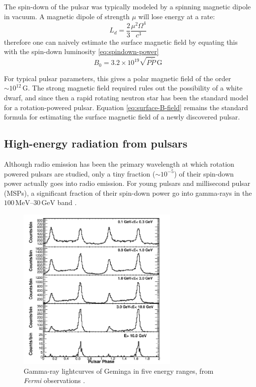 The spin-down of the pulsar was typically modeled by a spinning magnetic dipole
in vacuum. A magnetic dipole of strength $\mu$ will lose energy at a rate:
\begin{equation}
  \label{eq:dipole-spin-down}
  L_{d} = \frac{2}{3}\frac{\mu^2\Omega^4}{c^3}
\end{equation}
therefore one can naively estimate the surface magnetic field by equating this
with the spin-down luminosity \eqref{eq:spindown-power}
\begin{equation}
  \label{eq:surface-B-field}
  B_0 = 3.2\times 10^{19}\sqrt{P \dot{P}}\,\mathrm{G}
\end{equation}

For typical pulsar parameters, this gives a polar magnetic field of the order
$\sim 10^{12}\,\mathrm{G}$. The strong magnetic field required rules out the
possibility of a white dwarf, and since then a rapid rotating neutron star has
been the standard model for a rotation-powered pulsar. Equation
\eqref{eq:surface-B-field} remains the standard formula for estimating the surface
magnetic field of a newly discovered pulsar.

\subsection{High-energy radiation from pulsars}
\label{sec:observ-high-energy}

Although radio emission has been the primary wavelength at which rotation
powered pulsars are studied, only a tiny fraction ($\sim 10^{-5}$) of their
spin-down power actually goes into radio emission. For young pulsars and
millisecond pulsar (MSPs), a significant fraction of their spin-down power go
into gamma-rays in the $100\,\mathrm{MeV}$--$30\,\mathrm{GeV}$ band \citep[see
e.g.][]{abdo_fermi_2010}.

\begin{figure}[h]
  \centering
  \includegraphics[width=0.7\textwidth]{pics/intro/geminga2.png}
  \caption{Gamma-ray lightcurves of Geminga in five energy ranges, from {\it
      Fermi} observations \citep{abdo_fermi-lat_2010}.}
  \label{fig:geminga}
\end{figure}

